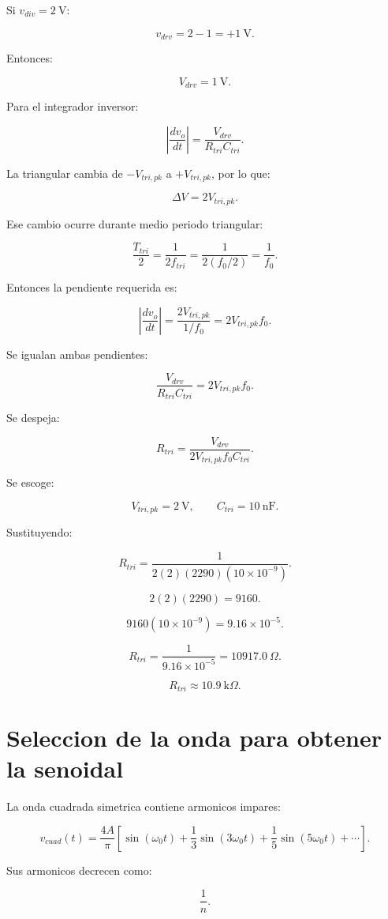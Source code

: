 \documentclass[11pt,letterpaper]{article}
\begin{document}
Si \(v_{div}=2~\text{V}\):

\[
v_{drv}=2-1=+1~\text{V}.
\]

Entonces:

\[
V_{drv}=1~\text{V}.
\]

Para el integrador inversor:

\[
\left|\frac{dv_o}{dt}\right|=
\frac{V_{drv}}{R_{tri}C_{tri}}.
\]

La triangular cambia de \(-V_{tri,pk}\) a \(+V_{tri,pk}\), por lo que:

\[
\Delta V=2V_{tri,pk}.
\]

Ese cambio ocurre durante medio periodo triangular:

\[
\frac{T_{tri}}{2}
=
\frac{1}{2f_{tri}}
=
\frac{1}{2(f_0/2)}
=
\frac{1}{f_0}.
\]

Entonces la pendiente requerida es:

\[
\left|\frac{dv_o}{dt}\right|
=
\frac{2V_{tri,pk}}{1/f_0}
=
2V_{tri,pk}f_0.
\]

Se igualan ambas pendientes:

\[
\frac{V_{drv}}{R_{tri}C_{tri}}
=
2V_{tri,pk}f_0.
\]

Se despeja:

\[
R_{tri}=
\frac{V_{drv}}
{2V_{tri,pk}f_0C_{tri}}.
\]

Se escoge:

\[
V_{tri,pk}=2~\text{V},
\qquad
C_{tri}=10~\text{nF}.
\]

Sustituyendo:

\[
R_{tri}=
\frac{1}
{2(2)(2290)(10\times 10^{-9})}.
\]

\[
2(2)(2290)=9160.
\]

\[
9160(10\times 10^{-9})=9.16\times 10^{-5}.
\]

\[
R_{tri}=\frac{1}{9.16\times 10^{-5}}
=10917.0~\Omega.
\]

\[
\boxed{R_{tri}\approx 10.9~\text{k}\Omega}.
\]

\section{Seleccion de la onda para obtener la senoidal}

La onda cuadrada simetrica contiene armonicos impares:

\[
v_{cuad}(t)=
\frac{4A}{\pi}
\left[
\sin(\omega_0 t)
+\frac{1}{3}\sin(3\omega_0 t)
+\frac{1}{5}\sin(5\omega_0 t)
+\cdots
\right].
\]

Sus armonicos decrecen como:

\[
\frac{1}{n}.
\]
\end{document}
